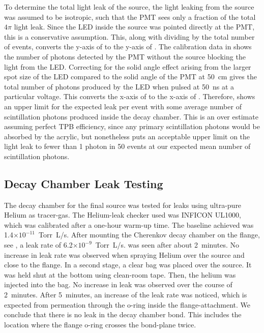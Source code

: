 To determine the total light leak of the source, the light leaking from the source was assumed to be isotropic, such that the PMT sees only a fraction of the total $4\pi$ light leak.
Since the LED inside the source was pointed directly at the PMT, this is a conservative assumption. 
This, along with dividing by the total number of events, converts the y-axis of  to the y-axis of . The calibration data in  shows the number of photons detected by the PMT without the source blocking the light from the LED. Correcting for the solid angle effect arising from the larger spot size of the LED compared to the solid angle of the PMT at 50~cm gives the total number of photons produced by the LED when pulsed at 50~ns at a particular voltage. This converts the x-axis of  to the x-axis of . Therefore,  shows an upper limit for the expected leak per event with some average number of scintillation photons produced inside the decay chamber. This is an over estimate assuming perfect TPB efficiency, since any primary scintillation photons would be absorbed by the acrylic, but nonetheless puts an acceptable upper limit on the light leak to fewer than 1 photon in 50 events at our expected mean number of scintillation photons.

\subsection{Decay Chamber Leak Testing}
\label{sec:heleak}
The decay chamber for the final source was tested for leaks using ultra-pure Helium as tracer-gas. The Helium-leak checker used was INFICON UL1000, which was calibrated after a one-hour warm-up time. The baseline achieved was 1.4$\times10^{-11}$~Torr~L/s. After mounting the Cherenkov decay chamber on the flange, see , a leak rate of 6.2$\times10^{-9}$~Torr~L/s. was seen after about 2~minutes. No increase in leak rate was observed when spraying Helium over the source and close to the flange. In a second stage, a clear bag was placed over the source. It was held shut at the bottom using clean-room tape. Then, the helium was injected into the bag. No increase in leak was observed over the course of 2~minutes. After 5~minutes, an increase of the leak rate was noticed, which is expected from permeation through the o-ring inside the flange-attachment. We conclude that there is no leak in the decay chamber bond. This includes the location where the flange o-ring crosses the bond-plane twice.


